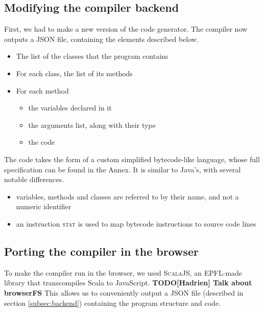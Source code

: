\subsection{Modifying the compiler backend}
\label{backend}

First, we had to make a new version of the code generator. The compiler now outputs a JSON file, containing the elements described below.

\begin{itemize}
\item The list of the classes that the program contains
\item For each class, the list of its methods
\item For each method
	\begin{itemize}
	\item the variables declared in it
	\item the arguments list, along with their type
	\item the code
	\end{itemize}
\end{itemize}

The code takes the form of a custom simplified bytecode-like language, whose full specification can be found in the Annex. It is similar to Java's, with several notable differences.

\begin{itemize}
\item variables, methods and classes are referred to by their name, and not a numeric identifier
\item an instruction \textsc{stat} is used to map bytecode instructions to source code lines
\end{itemize}





\subsection{Porting the compiler in the browser}

To make the compiler run in the browser, we used \textsc{ScalaJS}, an EPFL-made library that transcompiles Scala to JavaScript.
\textbf{TODO[Hadrien] Talk about browserFS}
This allows us to conveniently output a JSON file (described in section \ref{subsec:backend}) containing the program structure and code.


